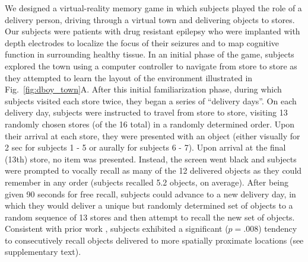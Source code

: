 We designed a virtual-reality memory game in which subjects played the role of a delivery person, driving through a virtual town and delivering objects to stores.  Our subjects were patients with drug resistant epilepsy who were implanted with depth electrodes to localize the focus of their seizures and to map cognitive function in surrounding healthy tissue. In an initial phase of the game, subjects explored the town using a computer controller to navigate from store to store as they attempted to learn the layout of the environment illustrated in Fig.~\ref{fig:dboy_town}A.  After this initial familiarization phase, during which subjects visited each store twice, they began a series of ``delivery days''.  On each delivery day, subjects were instructed to travel from store to store, visiting 13 randomly chosen stores (of the 16 total) in a randomly determined order.  Upon their arrival at each store, they were presented with an object (either visually for 2 sec for subjects 1 - 5 or aurally for subjects 6 - 7).  Upon arrival at the final (13th) store, no item was presented. Instead, the screen went black and subjects were prompted to vocally recall as many of the 12 delivered objects as they could remember in any order (subjects recalled 5.2 objects, on average).  After being given 90 seconds for free recall, subjects could advance to a new delivery day, in which they would deliver a unique but randomly determined set of objects to a random sequence of 13 stores and then attempt to recall the new set of objects. Consistent with prior work \cite{MillEtal12a}, subjects exhibited a significant ($p=.008$) tendency to consecutively recall objects delivered to more spatially proximate locations (see supplementary  text).


